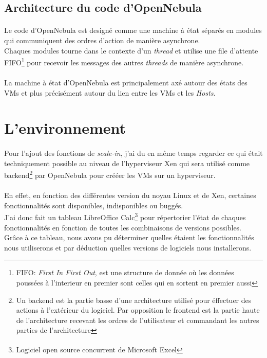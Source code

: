 \subsection{Architecture du code d'OpenNebula}
\paragraph*{}
Le code d'OpenNebula est designé comme une machine à état séparés en modules qui communiquent des ordres d'action de manière asynchrone.
\\
Chaques modules tourne dans le contexte d'un \emph{thread} et utilise une file d'attente FIFO\footnote{FIFO: \emph{First In First Out}, est une structure de donnée où les données poussées à l'interieur
en premier sont celles qui en sortent en premier aussi} pour recevoir les messages des autres \emph{threads} de manière asynchrone.

\paragraph*{}
La machine à état d'OpenNebula est principalement axé autour des états des VMs et plus précisément autour du lien entre les VMs et les \emph{Hosts}.


\section{L'environnement}

\paragraph*{}
Pour l'ajout des fonctions de \emph{scale-in}, j'ai du en même temps regarder ce qui était techniquement possible au niveau de l'hyperviseur Xen qui
sera utilisé comme backend\footnote{Un backend est la partie basse d'une architecture utilisé pour éffectuer des actions à l'extérieur du logiciel.
Par opposition le frontend est la partie haute de l'architecture recevant les ordres de l'utilisateur et commandant les autres parties de l'architecture}
par OpenNebula pour crééer les VMs sur un hyperviseur.

\paragraph*{}
En effet, en fonction des différentes version du noyau Linux et de Xen, certaines fonctionnalités sont disponibles, indisponibles ou buggés.\\
J'ai donc fait un tableau LibreOffice Calc\footnote{Logiciel open source concurrent de Microsoft\textsuperscript{\textregistered} Excel\texttrademark}
pour répertorier l'état de chaques fonctionnalités en fonction de toutes les combinaisons de versions possibles.
\\
Grâce à ce tableau, nous avons pu déterminer quelles étaient les fonctionnalités nous utiliserons et par déduction quelles versions de logiciels nous
installerons.

